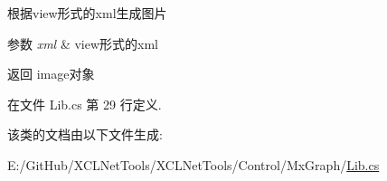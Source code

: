 根据view形式的xml生成图片 


\begin{DoxyParams}{参数}
{\em xml} & view形式的xml\\
\hline
\end{DoxyParams}
\begin{DoxyReturn}{返回}
image对象
\end{DoxyReturn}


在文件 Lib.\+cs 第 29 行定义.



该类的文档由以下文件生成\+:\begin{DoxyCompactItemize}
\item 
E\+:/\+Git\+Hub/\+X\+C\+L\+Net\+Tools/\+X\+C\+L\+Net\+Tools/\+Control/\+Mx\+Graph/\hyperlink{_control_2_mx_graph_2_lib_8cs}{Lib.\+cs}\end{DoxyCompactItemize}
